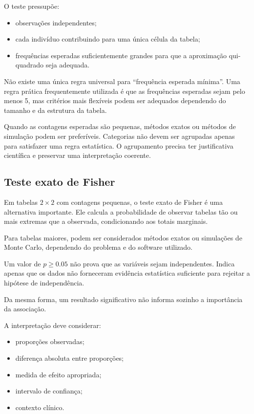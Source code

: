 O teste pressupõe:

\begin{itemize}
    \item observações independentes;
    \item cada indivíduo contribuindo para uma única célula da tabela;
    \item frequências esperadas suficientemente grandes para que a aproximação
    qui-quadrado seja adequada.
\end{itemize}

Não existe uma única regra universal para ``frequência esperada mínima''. Uma
regra prática frequentemente utilizada é que as frequências esperadas sejam
pelo menos 5, mas critérios mais flexíveis podem ser adequados dependendo do
tamanho e da estrutura da tabela.

Quando as contagens esperadas são pequenas, métodos exatos ou métodos de
simulação podem ser preferíveis. Categorias não devem ser agrupadas apenas para satisfazer uma regra estatística. O agrupamento precisa ter justificativa científica e preservar uma interpretação coerente.

\subsection{Teste exato de Fisher}

Em tabelas $2\times2$ com contagens pequenas, o teste exato de Fisher é uma
alternativa importante. Ele calcula a probabilidade de observar tabelas tão ou mais extremas que a observada, condicionando aos totais marginais. 

Para tabelas maiores, podem ser considerados métodos exatos ou simulações de
Monte Carlo, dependendo do problema e do software utilizado.

\begin{error}
Um valor de $p\geq0.05$ não prova que as variáveis sejam independentes. Indica
apenas que os dados não forneceram evidência estatística suficiente para
rejeitar a hipótese de independência.

Da mesma forma, um resultado significativo não informa sozinho a importância
da associação.

A interpretação deve considerar:

\begin{itemize}
    \item proporções observadas;
    \item diferença absoluta entre proporções;
    \item medida de efeito apropriada;
    \item intervalo de confiança;
    \item contexto clínico.
\end{itemize}
\end{error}

